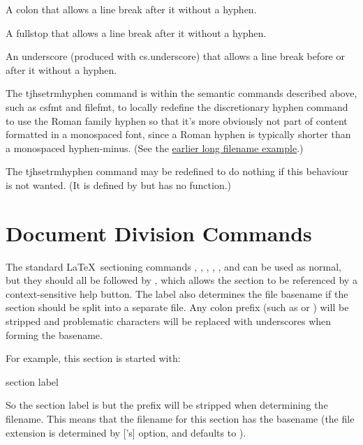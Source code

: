 \documentclass[toc=listof]{scrreport}
\newcommand\TJHMKswitch[1]{\switch{texjavahelpmk.#1}}
\begin{document}
A \gls{colon} that allows a line break after it without a hyphen.

A \gls{fullstop} that allows a line break after it without a hyphen.

An underscore (produced with \gls{cs.underscore}) that allows a line break before
or after it without a hyphen.

The \gls{tjhsetrmhyphen} command is within the semantic commands
described above, such as \gls{csfmt} and \gls{filefmt}, to locally
redefine the discretionary hyphen command  to
use the Roman family hyphen so that it's more obviously not part of
content formatted in a monospaced font, since a Roman \gls{hyphen}
is typically shorter than a monospaced \gls{hyphen-minus}.
(See the \hyperlink{longfilenameexample}{earlier long filename example}.)

The \gls{tjhsetrmhyphen} command may be redefined to do nothing if
this behaviour is not wanted. (It is defined by 
but has no function.) 

\section{Document Division Commands}
\label{sec:docdivisioncmds}

The standard \LaTeX\ sectioning commands , ,
, ,
,  and
 can be used as
normal, but they should all be followed by
, which allows the section to be
referenced by a context-sensitive help button. The label also
determines the file basename if the section should be split into a
separate file. Any colon prefix (such as  or )
will be stripped and problematic characters will be replaced with underscores when
forming the basename.

For example, this section is started with:
\begin{codebox}
\gls{section}
\gls{label}
\end{codebox}
So the section label is  but the
 prefix will be stripped when determining the filename.
This means that the filename for this section has the basename
 (the file extension is determined by
['s] \TJHMKswitch{html-ext} option, and defaults
to ).
\end{document}
